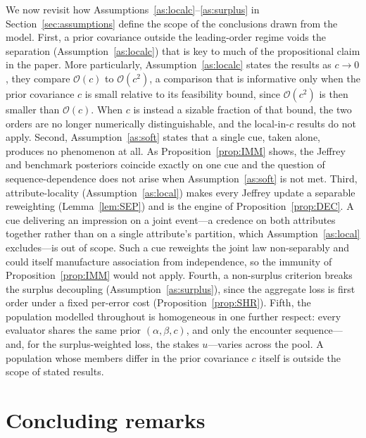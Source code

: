 \documentclass[a4paper,fleqn]{cas-sc}
\theoremstyle{remark}
\theoremstyle{definition}
\newcommand{\bigO}{\mathcal{O}}
\begin{document}
We now revisit how Assumptions~\ref{as:localc}--\ref{as:surplus} in
Section~\ref{sec:assumptions} define the scope of the conclusions drawn from the
model. First, a prior covariance outside the leading-order regime voids the separation (Assumption~\ref{as:localc}) that is key to much of the propositional claim in the paper. More particularly, Assumption~\ref{as:localc} states the results as $c\to0$, they compare $\bigO(c)$ to $\bigO(c^{2})$, a comparison that is informative only when the prior covariance $c$ is small relative to its feasibility bound, since $\bigO(c^{2})$ is then smaller than $\bigO(c)$. When $c$ is instead a sizable fraction of that bound, the two orders are no longer numerically distinguishable, and the local-in-$c$ results do not apply. Second, Assumption~\ref{as:soft} states that a single cue, taken alone, produces no phenomenon at all. As Proposition~\ref{prop:IMM} shows, the Jeffrey and benchmark posteriors coincide exactly on one cue and the question of sequence-dependence does not arise when Assumption~\ref{as:soft} is not met. Third, attribute-locality (Assumption~\ref{as:local}) makes every Jeffrey update a separable reweighting (Lemma~\ref{lem:SEP}) and is the engine of Proposition~\ref{prop:DEC}. A cue delivering an impression on a joint event---a credence on both attributes together rather than on a single attribute's partition, which Assumption~\ref{as:local} excludes---is out of scope. Such a cue reweights the joint law non-separably and could itself manufacture association from independence, so the immunity of Proposition~\ref{prop:IMM} would not apply. Fourth, a non-surplus criterion breaks the surplus decoupling (Assumption~\ref{as:surplus}), since the aggregate loss is first order under a fixed per-error cost (Proposition~\ref{prop:SHR}). Fifth, the population modelled throughout is homogeneous in one further respect: every evaluator shares the same prior $(\alpha,\beta,c)$, and only the encounter sequence---and, for the surplus-weighted loss, the stakes $u$---varies across the pool. A population whose members differ in the prior covariance $c$ itself is outside the scope of stated results.

\section{Concluding remarks}
\label{sec:conclusion}
\end{document}
